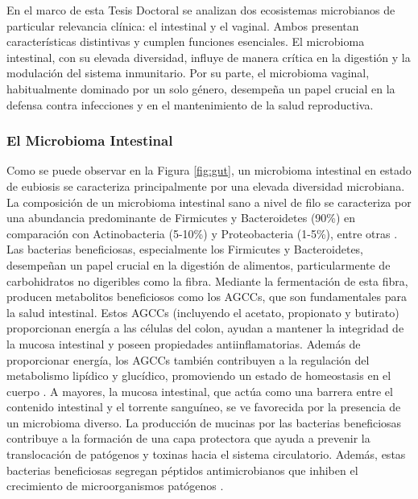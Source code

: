 En el marco de esta Tesis Doctoral se analizan dos ecosistemas microbianos de particular relevancia clínica: el intestinal y el vaginal. Ambos presentan características distintivas y cumplen funciones esenciales. El microbioma intestinal, con su elevada diversidad, influye de manera crítica en la digestión y la modulación del sistema inmunitario. Por su parte, el microbioma vaginal, habitualmente dominado por un solo género, desempeña un papel crucial en la defensa contra infecciones y en el mantenimiento de la salud reproductiva.

\subsubsection{El Microbioma Intestinal}


Como se puede observar en la Figura \ref{fig:gut}, un microbioma intestinal en estado de eubiosis se caracteriza principalmente por una elevada diversidad microbiana. La composición de un microbioma intestinal sano a nivel de filo se caracteriza por una abundancia predominante de Firmicutes y Bacteroidetes (90\%) en comparación con Actinobacteria (5-10\%) y Proteobacteria (1-5\%), entre otras \cite{rinninella2019healthy}. Las bacterias beneficiosas, especialmente los Firmicutes y Bacteroidetes, desempeñan un papel crucial en la digestión de alimentos, particularmente de carbohidratos no digeribles como la fibra. Mediante la fermentación de esta fibra, producen metabolitos beneficiosos como los AGCCs, que son fundamentales para la salud intestinal. Estos AGCCs (incluyendo el acetato, propionato y butirato) proporcionan energía a las células del colon, ayudan a mantener la integridad de la mucosa intestinal y poseen propiedades antiinflamatorias. Además de proporcionar energía, los AGCCs también contribuyen a la regulación del metabolismo lipídico y glucídico, promoviendo un estado de homeostasis en el cuerpo \cite{rinninella2019healthy, flint2012role}. A mayores, la mucosa intestinal, que actúa como una barrera entre el contenido intestinal y el torrente sanguíneo, se ve favorecida por la presencia de un microbioma diverso. La producción de mucinas por las bacterias beneficiosas contribuye a la formación de una capa protectora que ayuda a prevenir la translocación de patógenos y toxinas hacia el sistema circulatorio. Además, estas bacterias beneficiosas segregan péptidos antimicrobianos que inhiben el crecimiento de microorganismos patógenos \cite{cani2016talking, alvarez2021gut}.

